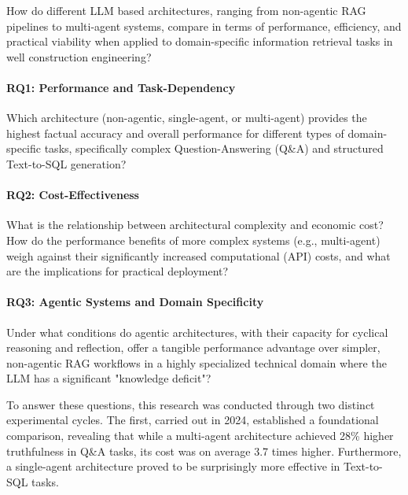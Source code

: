     \vspace{\baselineskip}
    \begin{tcolorbox}[colback=gray!10, colframe=gray!40, title=\textbf{Main Research Question}]
    How do different LLM based architectures, ranging from non-agentic RAG pipelines to multi-agent systems, compare in terms of performance, efficiency, and practical viability when applied to domain-specific information retrieval tasks in well construction engineering?
    \end{tcolorbox}
    \vspace{\baselineskip}

    \paragraph{RQ1: Performance and Task-Dependency} Which architecture (non-agentic, single-agent, or multi-agent) provides the highest factual accuracy and overall performance for different types of domain-specific tasks, specifically complex Question-Answering (Q\&A) and structured Text-to-SQL generation?

    \paragraph{RQ2: Cost-Effectiveness} What is the relationship between architectural complexity and economic cost? How do the performance benefits of more complex systems (e.g., multi-agent) weigh against their significantly increased computational (API) costs, and what are the implications for practical deployment?

    \paragraph{RQ3: Agentic Systems and Domain Specificity} Under what conditions do agentic architectures, with their capacity for cyclical reasoning and reflection, offer a tangible performance advantage over simpler, non-agentic RAG workflows in a highly specialized technical domain where the LLM has a significant "knowledge deficit"?

    \vspace{\baselineskip}

    To answer these questions, this research was conducted through two distinct experimental cycles. The first, carried out in 2024, established a foundational comparison, revealing that while a multi-agent architecture achieved 28\% higher truthfulness in Q\&A tasks, its cost was on average 3.7 times higher. Furthermore, a single-agent architecture proved to be surprisingly more effective in Text-to-SQL tasks.


